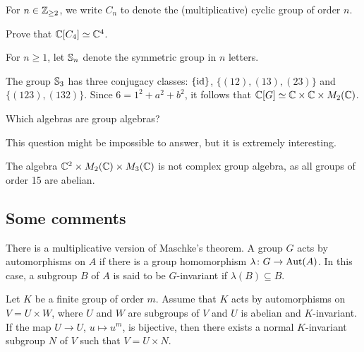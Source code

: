 For $n\in\mathbb{Z}_{\geq2}$, we write $C_n$ to denote the (multiplicative) cyclic group of order $n$. 

\begin{exercise}
    Prove that $\mathbb{C}[C_4]\simeq\mathbb{C}^4$. 
\end{exercise}

For $n\geq1$, let $\mathbb{S}_n$ denote the symmetric group in $n$ letters. 

\begin{example}
    The group $\mathbb{S}_3$ has three conjugacy classes:
    $\{\operatorname{id}\}$, $\{(12),(13),(23)\}$ and $\{(123),(132)\}$. 
    Since $6=1^2+a^2+b^2$, it follows that 
    $\mathbb{C}[G]\simeq\mathbb{C}\times\mathbb{C}\times M_2(\mathbb{C})$. 
\end{example}    

\begin{problem}[Brauer]
    Which algebras are group algebras?
\end{problem}

This question might be impossible to answer, but it is extremely interesting.

\begin{example}
    The algebra $\mathbb{C}^2\times M_2(\mathbb{C})\times M_3(\mathbb{C})$ is not complex group algebra, as all groups of order 15 are abelian. 
\end{example}

\subsection{Some comments}

There is a multiplicative version of Maschke's theorem. A group $G$ acts 
by automorphisms on $A$ if there is a group homomorphism 
$\lambda\colon G\to\operatorname{Aut}(A)$. In this case, a subgroup $B$ of $A$ is said to be 
$G$-invariant if $\lambda(B)\subseteq B$. 

\begin{theorem}
    Let $K$ be a finite group of order $m$. Assume that 
    $K$ acts by automorphisms on $V=U\times W$, where
    $U$ and $W$ are subgroups of $V$ and $U$ is abelian and $K$-invariant. 
    If the map $U\to U$, $u\mapsto u^m$, is bijective, 
    then there exists a normal $K$-invariant subgroup $N$ of $V$ 
    such that $V=U\times N$. 
\end{theorem}

